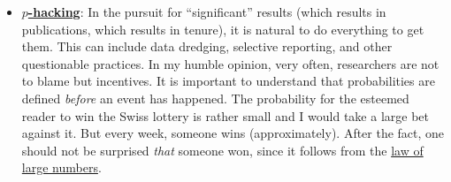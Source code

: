 \documentclass[
]{book}
\begin{document}
\begin{itemize}
  \begin{quote}
  \textbf{Try it yourself.} In the animation
  \href{https://jdegenfellner.github.io/Script_QM1_ZHAW/animations/26_Publikationsbias_Forest_Plot.html}{Publication bias: forest plot and meta-analysis}
  many studies of the same question are simulated. You set the true effect (0 means that \(H_0\) is true),
  the sample size and the share of unwanted results that still get published.
  A meta-analysis of all studies recovers the true effect, a meta-analysis of the published studies alone
  does not: it overestimates the effect, because selection by \(p\)-value keeps the studies that happened
  to overshoot.
  \end{quote}
\item
  \textbf{\href{https://de.wikipedia.org/wiki/P-Hacking}{\(p\)-hacking}}: In the pursuit for ``significant'' results
  (which results in publications, which results in tenure), it is natural to do everything to get them.
  This can include data dredging, selective reporting, and other questionable practices.
  In my humble opinion, very often, researchers are not to blame but incentives. It is important to understand
  that probabilities are defined \emph{before} an event has happened. The probability for the esteemed reader to win the
  Swiss lottery is rather small and I would take a large bet against it. But every week, someone wins (approximately).
  After the fact, one should not be surprised \emph{that} someone won,
  since it follows from the \href{https://en.wikipedia.org/wiki/Law_of_large_numbers}{law of large numbers}.


\end{itemize}
\end{document}
